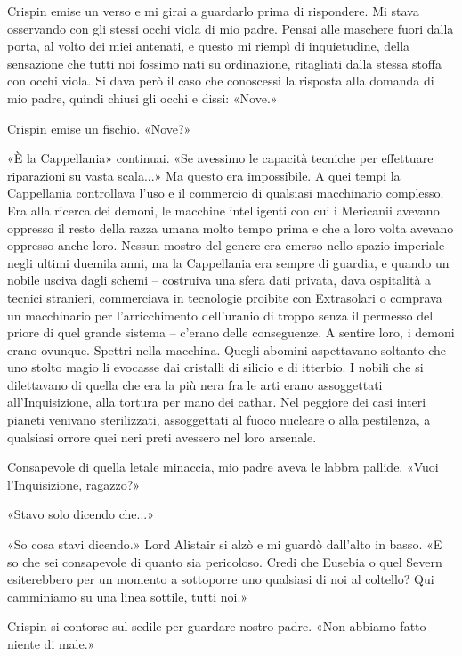 Crispin emise un verso e mi girai a guardarlo prima di rispondere. Mi
stava osservando con gli stessi occhi viola di mio padre. Pensai alle
maschere fuori dalla porta, al volto dei miei antenati, e questo mi
riempì di inquietudine, della sensazione che tutti noi fossimo nati su
ordinazione, ritagliati dalla stessa stoffa con occhi viola. Si dava
però il caso che conoscessi la risposta alla domanda di mio padre,
quindi chiusi gli occhi e dissi: «Nove.»

Crispin emise un fischio. «Nove?»

«È la Cappellania» continuai. «Se avessimo le capacità tecniche per
effettuare riparazioni su vasta scala...» Ma questo era impossibile. A
quei tempi la Cappellania controllava l'uso e il commercio di qualsiasi
macchinario complesso. Era alla ricerca dei demoni, le macchine
intelligenti con cui i Mericanii avevano oppresso il resto della razza
umana molto tempo prima e che a loro volta avevano oppresso anche loro.
Nessun mostro del genere era emerso nello spazio imperiale negli ultimi
duemila anni, ma la Cappellania era sempre di guardia, e quando un
nobile usciva dagli schemi -- costruiva una sfera dati privata, dava
ospitalità a tecnici stranieri, commerciava in tecnologie proibite con
Extrasolari o comprava un macchinario per l'arricchimento dell'uranio di
troppo senza il permesso del priore di quel grande sistema -- c'erano
delle conseguenze. A sentire loro, i demoni erano ovunque. Spettri nella
macchina. Quegli abomini aspettavano soltanto che uno stolto magio li
evocasse dai cristalli di silicio e di itterbio. I nobili che si
dilettavano di quella che era la più nera fra le arti erano assoggettati
all'Inquisizione, alla tortura per mano dei cathar. Nel peggiore dei
casi interi pianeti venivano sterilizzati, assoggettati al fuoco
nucleare o alla pestilenza, a qualsiasi orrore quei neri preti avessero
nel loro arsenale.

Consapevole di quella letale minaccia, mio padre aveva le labbra
pallide. «Vuoi l'Inquisizione, ragazzo?»

«Stavo solo dicendo che...»

«So cosa stavi dicendo.» Lord Alistair si alzò e mi guardò dall'alto in
basso. «E so che sei consapevole di quanto sia pericoloso. Credi che
Eusebia o quel Severn esiterebbero per un momento a sottoporre uno
qualsiasi di noi al coltello? Qui camminiamo su una linea sottile, tutti
noi.»

Crispin si contorse sul sedile per guardare nostro padre. «Non abbiamo
fatto niente di male.»

